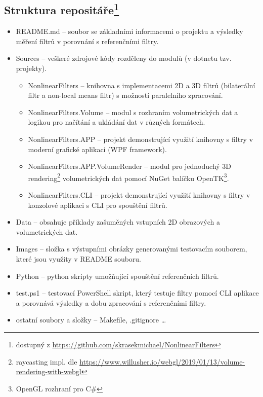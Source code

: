 \subsection*{Struktura repositáře\footnote{dostupný z \url{https://github.com/skrasekmichael/NonlinearFilters}}}
\begin{itemize}
    \item README.md -- soubor se základními informacemi o projektu a výsledky měření filtrů v porovnání s referenčními filtry. 
    \item Sources -- veškeré zdrojové kódy rozděleny do modulů (v dotnetu tzv. projekty).
    \begin{itemize}
        \item NonlinearFilters -- knihovna s implementacemi 2D a 3D filtrů (bilaterální filtr a non-local means filtr) s možností paralelního zpracování.
        \item NonlinearFilters.Volume -- modul s rozhraním volumetrických dat a logikou pro načítání a ukládání dat v různých formátech.
        \item NonlinearFilters.APP -- projekt demonstrující využití knihovny s filtry v moderní grafické aplikaci (WPF framework).
        \item NonlinearFilters.APP.VolumeRender -- modul pro jednoduchý 3D rendering\footnote{raycasting impl. dle \url{https://www.willusher.io/webgl/2019/01/13/volume-rendering-with-webgl}} volumetrických dat pomocí NuGet balíčku OpenTK\footnote{OpenGL rozhraní pro C\#}.
        \item NonlinearFilters.CLI -- projekt demonstrující využití knihovny s filtry v konzolové aplikaci s CLI pro spouštění filtrů.
    \end{itemize}
    \item Data -- obsahuje příklady zašuměných vstupních 2D obrazových a volumetrických dat.
    \item Images -- složka s výstupními obrázky generovanými testovacím souborem, které jsou využity v README souboru.
    \item Python -- python skripty umožňující spouštění referenčních filtrů.
    \item test.ps1 -- testovací PowerShell skript, který testuje filtry pomocí CLI aplikace a porovnává výsledky a dobu zpracování s referenčními filtry. 
    \item ostatní soubory a složky -- Makefile, .gitignore \dots
\end{itemize}

